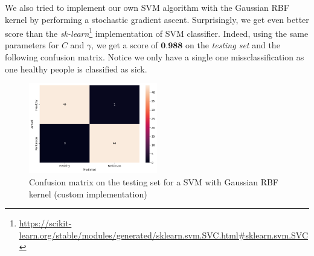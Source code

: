 We also tried to implement our own SVM algorithm with the Gaussian RBF kernel by performing a stochastic gradient ascent. Surprisingly, we get even better score than the \textit{sk-learn}\footnote{\url{https://scikit-learn.org/stable/modules/generated/sklearn.svm.SVC.html\#sklearn.svm.SVC}} implementation of SVM classifier. Indeed, using the same parameters for $C$ and $\gamma$, we get a score of $\textbf{0.988}$ on the \textit{testing set} and the following confusion matrix. Notice we only have a single one missclassification as one healthy people is classified as sick.

\begin{figure}[H]
	\centering
	\includegraphics[width=0.5\textwidth]{figures/custom_svm_cm.png}
	\caption{Confusion matrix on the testing set for a SVM with Gaussian RBF kernel (custom implementation)}
	\label{fig:custom-svm-cm}
\end{figure}